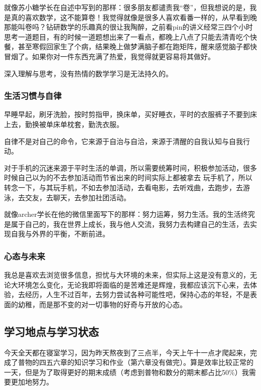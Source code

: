 \documentclass[12pt, a4paper, oneside]{ctexart}
\begin{document}
就像苏小糖学长在自述中写到的那样：很多朋友都谴责我“卷”，但我想说的是，我是真的喜欢数学，这不能算卷！我觉得就像是很多人喜欢看番一样的，从早看到晚那能叫卷吗？钻研数学的乐趣真的很让我陶醉，之前看pin的讲义经常三四个小时思考一道题目，有的时候一道题想出来了一看点，都晚上八点了只能去清青吃个快餐，甚至寒假回家生了个病，结果晚上做梦满脑子都在跑矩阵，醒来感觉脑子都快冒烟了。如果你对一件东西充满了热爱，我觉得就更容易将其做好。

深入理解与思考，没有热情的数学学习是无法持久的。

\subsubsection{生活习惯与自律}

早睡早起，刷牙洗脸，按时剪指甲，换床单，买好睡衣，平时的衣服裤子不要到床上去，勤换被单床单枕套，勤洗衣服。

自律不是对自己的命令，它来源于自治与自洽，来源于清醒的自我认知与自我行动。

对于手机的沉迷来源于平时生活的单调，所以需要统筹时间，积极参加活动，很多时候自己以为的不去参加活动而节省出来的时间实际上都被拿去
玩手机了，所以转念一下，与其玩手机，不如去参加活动，去看电影，去听戏曲，去跑步，去游泳，去交友，去聊天，去参加社团活动。

就像archer学长在他的微信里面写下的那样：努力运筹，努力生活。我的生活终究是属于自己的，我在世界上成长，我与他人交流，我努力去构建自己的生活，去实现自我与外界的平衡，不断前进。

\subsubsection{心态与未来}

我总是喜欢去浏览很多信息，担忧与大环境的未来，但实际上这是没有意义的，无论大环境怎么变化，无论我即将面临的是苦难还是辉煌，我都应该沉下心来，去体验，去经历，人生不过百年，去努力尝试各种可能性吧，保持心态的年轻，不是表面的幼稚，而是那不变的对一切事物的好奇与开放的心态。

\newpage
\subsection{学习地点与学习状态}

\date{2023年6月15日}

今天全天都在寝室学习，因为昨天熬夜到了三点半，今天上午十一点才爬起来，完成了普物的四五六章的知识学习和作业（第六章没有做完）。算是效率比较正常的一天，但是为了取得更好的期末成绩（考虑到普物和数分的期末都占比50\%）我需要更加地努力。
\end{document}

